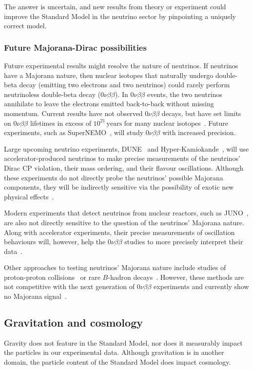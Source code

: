 The answer is uncertain, and new results from theory or experiment could
improve the Standard Model in the neutrino sector
by pinpointing a uniquely correct model.

\subsubsection{Future Majorana-Dirac possibilities}
Future experimental results might resolve the nature of neutrinos.
If neutrinos have a Majorana nature, then nuclear isotopes that naturally
undergo double-beta decay (emitting two electrons and two neutrinos)
could rarely perform neutrinoless double-beta decay ($0\nu\beta\beta$).
In $0\nu\beta\beta$ events, the two neutrinos annihilate to leave the electrons
emitted back-to-back without missing momentum.
Current results have not observed $0\nu\beta\beta$ decays, but have set limits
on $0\nu\beta\beta$ lifetimes in excess of $10^{21}\,\mathrm{years}$
for many nuclear isotopes~\cite{Bilenky:2014uka}.
Future experiments, such as SuperNEMO~\cite{Barabash:2011row},
will study $0\nu\beta\beta$ with increased precision.

Large upcoming neutrino experiments,
DUNE~\cite{DUNE:2016hlj} and
Hyper-Kamiokande~\cite{Hyper-Kamiokande:2018ofw},
will use accelerator-produced neutrinos to make precise measurements of the
neutrinos' Dirac CP violation,
their mass ordering, and their flavour oscillations.
Although these experiments do not directly probe the neutrinos' possible
Majorana components, they will be indirectly sensitive via the possibility
of exotic new physical effects~\cite{Carrasco-Martinez:2020mlg}.

Modern experiments that detect neutrinos from nuclear reactors,
such as JUNO~\cite{JUNO:2015sjr},
are also not directly sensitive to the question of the neutrinos' Majorana
nature.
Along with accelerator experiments, their precise measurements of oscillation
behaviours will, however, help the $0\nu\beta\beta$ studies to more precisely
interpret their data~\cite{Cao:2017drk}.

Other approaches to testing neutrinos' Majorana nature include studies of
proton-proton collisions~\cite{CMS:2018jxx} or
rare $B$-hadron decays~\cite{LHCb:2014osd,Shuve:2016muy}.
However, these methods are not competitive with the next generation of
$0\nu\beta\beta$ experiments and currently show no Majorana
signal~\cite{Carrasco-Martinez:2020mlg}.


\subsection{Gravitation and cosmology}
Gravity does not feature in the Standard Model, nor does it measurably impact
the particles in our experimental data.
Although gravitation is in another domain, the particle content of the
Standard Model does impact cosmology.

